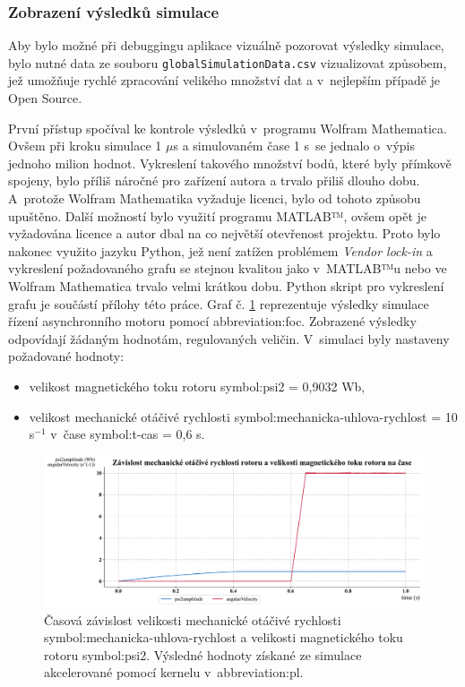 \documentclass[a4paper, twoside, 11pt]{article}
\newcommand{\fbar}{\FloatBarrier}
\begin{document}
			\fbar
			\subsubsection{Zobrazení výsledků simulace}\label{subsubsec:zobrazeni-vysledku-simulace}
			Aby bylo možné při debuggingu aplikace vizuálně pozorovat výsledky simulace, bylo nutné data ze souboru \texttt{globalSimulationData.csv} vizualizovat způsobem, jež umožňuje rychlé zpracování velikého množství dat a v~nejlepším případě je Open Source.\par
			První přístup spočíval ke kontrole výsledků v~programu Wolfram Mathematica. Ovšem při kroku simulace 1 $\mu$s a simulovaném čase 1 s~se jednalo o~výpis jednoho milion hodnot. Vykreslení takového množství bodů, které byly přímkově spojeny, bylo příliš náročné pro zařízení autora a trvalo přiliš dlouho dobu. A~protože Wolfram Mathematika vyžaduje licenci, bylo od tohoto způsobu upuštěno. Další možností bylo využití programu MATLAB™, ovšem opět je vyžadována licence a autor dbal na co největší otevřenost projektu. Proto bylo nakonec využito jazyku Python, jež není zatížen problémem \textit{Vendor lock-in} a vykreslení požadovaného grafu se stejnou kvalitou jako v~MATLAB™u nebo ve Wolfram Mathematica trvalo velmi krátkou dobu. Python skript pro vykreslení grafu je součástí přílohy této práce. Graf č. \ref{fig:k26-simulace-graf-mechanicka-rychlost-velikost-mg-toku-rotoru} reprezentuje výsledky simulace řízení asynchronního motoru pomocí \gls{abbreviation:foc}. Zobrazené výsledky odpovídají žádaným hodnotám, regulovaných veličin. V~simulaci byly nastaveny požadované hodnoty:
			\begin{itemize}
				\item velikost magnetického toku rotoru \gls{symbol:psi2} = 0,9032 Wb,
				\item velikost mechanické otáčivé rychlosti \gls{symbol:mechanicka-uhlova-rychlost} = 10 s$^{-1}$ v~čase \gls{symbol:t-cas} = 0,6 s.
			\end{itemize}

			


		\begin{figure}[htbp!]
			\centering
			\includegraphics[width=1\textwidth]{src/pdf/k26-simulace-graf-mechanicka-rychlost-velikost-mg-toku-rotoru.pdf}
			\caption{Časová závislost velikosti mechanické otáčivé rychlosti \gls{symbol:mechanicka-uhlova-rychlost} a velikosti magnetického toku rotoru \gls{symbol:psi2}. Výsledné hodnoty získané ze simulace akcelerované pomocí kernelu v~\gls{abbreviation:pl}.}
			\label{fig:k26-simulace-graf-mechanicka-rychlost-velikost-mg-toku-rotoru}
		\end{figure}
\end{document}
